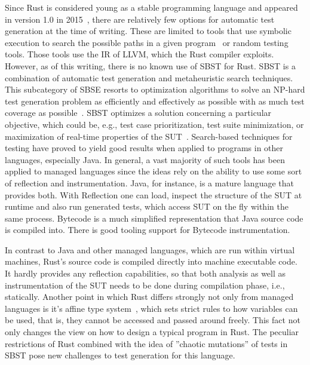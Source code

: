 \documentclass[paper=a4,%
  twoside,%
  BCOR4mm,%
  abstract=true,%
  toc=bibliography,%
  chapterprefix=true,%
  toc=bibliographynumbered,%
  open=right,%
  english,%
  pagesize=pdftex]{scrreprt}
\begin{document}
Since Rust is considered young as a stable programming language and appeared in version 1.0 in 2015~\cite{Rust10}, there are relatively few options for automatic test generation at the time of writing. These are limited to tools that use symbolic execution to search the possible paths in a given program~\cite{cadar2008klee} or random testing tools. Those tools use the \ac{IR} of LLVM, which the Rust compiler exploits. However, as of this writing, there is no known use of \ac{SBST} for Rust. \ac{SBST} is a combination of automatic test generation and metaheuristic search techniques. This subcategory of \ac{SBSE} resorts to optimization algorithms to solve an NP-hard test generation problem as efficiently and effectively as possible with as much test coverage as possible~\cite{Khari2019}. \ac{SBST} optimizes a solution concerning a particular objective, which could be, e.g., test case prioritization, test suite minimization, or maximization of real-time properties of the \ac{SUT}~\cite{Khari2019}. Search-based techniques for testing have proved to yield good results when applied to programs in other languages, especially Java. In general, a vast majority of such tools has been applied to managed languages since the ideas rely on the ability to use some sort of reflection and instrumentation. Java, for instance, is a mature language that provides both. With Reflection one can load, inspect the structure of the \ac{SUT} at runtime and also run generated tests, which access \ac{SUT} on the fly within the same process. Bytecode is a much simplified representation that Java source code is compiled into. There is good tooling support for Bytecode instrumentation.

In contrast to Java and other managed languages, which are run within virtual machines, Rust's source code is compiled directly into machine executable code. It hardly provides any reflection capabilities, so that both analysis as well as instrumentation of the \ac{SUT} needs to be done during compilation phase, i.e., statically. Another point in which Rust differs strongly not only from managed languages is it's affine type system~\cite{Anderson2016}, which sets strict rules to how variables can be used, that is, they cannot be accessed and passed around freely. This fact not only changes the view on how to design a typical program in Rust. The peculiar restrictions of Rust combined with the idea of ''chaotic mutations'' of tests in SBST pose new challenges to test generation for this language.
\end{document}

